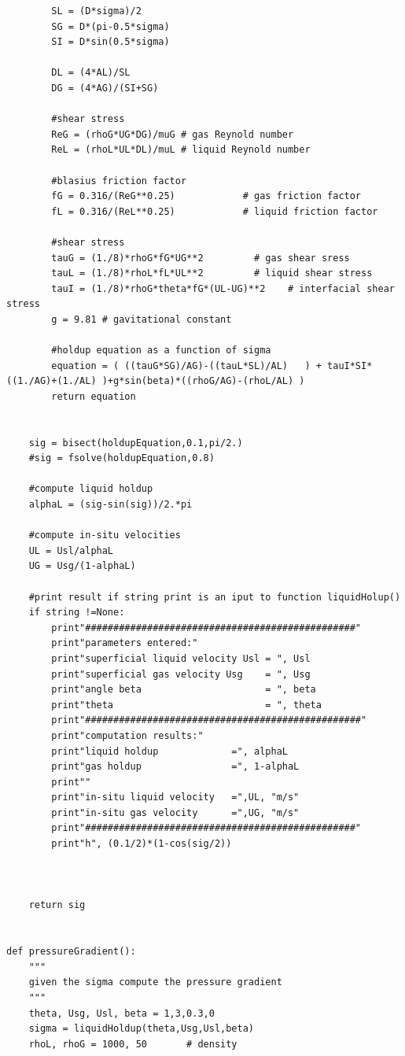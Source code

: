 \documentclass[10pt,a4paper]{report}
\begin{document}
\begin{lstlisting}
        SL = (D*sigma)/2  
        SG = D*(pi-0.5*sigma)
        SI = D*sin(0.5*sigma)
        
        DL = (4*AL)/SL
        DG = (4*AG)/(SI+SG)               
        
        #shear stress
        ReG = (rhoG*UG*DG)/muG # gas Reynold number
        ReL = (rhoL*UL*DL)/muL # liquid Reynold number
    
        #blasius friction factor
        fG = 0.316/(ReG**0.25)            # gas friction factor
        fL = 0.316/(ReL**0.25)            # liquid friction factor
    
        #shear stress
        tauG = (1./8)*rhoG*fG*UG**2         # gas shear sress
        tauL = (1./8)*rhoL*fL*UL**2         # liquid shear stress
        tauI = (1./8)*rhoG*theta*fG*(UL-UG)**2    # interfacial shear stress
        g = 9.81 # gavitational constant
        
        #holdup equation as a function of sigma
        equation = ( ((tauG*SG)/AG)-((tauL*SL)/AL)   ) + tauI*SI*((1./AG)+(1./AL) )+g*sin(beta)*((rhoG/AG)-(rhoL/AL) )
        return equation
    

    sig = bisect(holdupEquation,0.1,pi/2.)
    #sig = fsolve(holdupEquation,0.8)
     
    #compute liquid holdup
    alphaL = (sig-sin(sig))/2.*pi
     
    #compute in-situ velocities
    UL = Usl/alphaL
    UG = Usg/(1-alphaL)
     
    #print result if string print is an iput to function liquidHolup()
    if string !=None:
        print"################################################"
        print"parameters entered:"
        print"superficial liquid velocity Usl = ", Usl
        print"superficial gas velocity Usg    = ", Usg
        print"angle beta                      = ", beta
        print"theta                           = ", theta
        print"#################################################"
        print"computation results:"
        print"liquid holdup             =", alphaL
        print"gas holdup                =", 1-alphaL
        print""
        print"in-situ liquid velocity   =",UL, "m/s"
        print"in-situ gas velocity      =",UG, "m/s"
        print"################################################"
        print"h", (0.1/2)*(1-cos(sig/2))
         
         
    
    return sig
    

def pressureGradient():
    """
    given the sigma compute the pressure gradient
    """
    theta, Usg, Usl, beta = 1,3,0.3,0
    sigma = liquidHoldup(theta,Usg,Usl,beta)
    rhoL, rhoG = 1000, 50       # density


\end{lstlisting}
\end{document}
